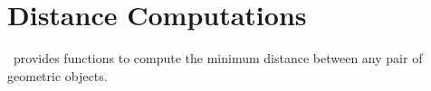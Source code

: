 
\cleardoublepage
\chapter{Distance Computations}\label{distance}

\cgal\ provides functions to compute the minimum distance between
any pair of geometric objects.